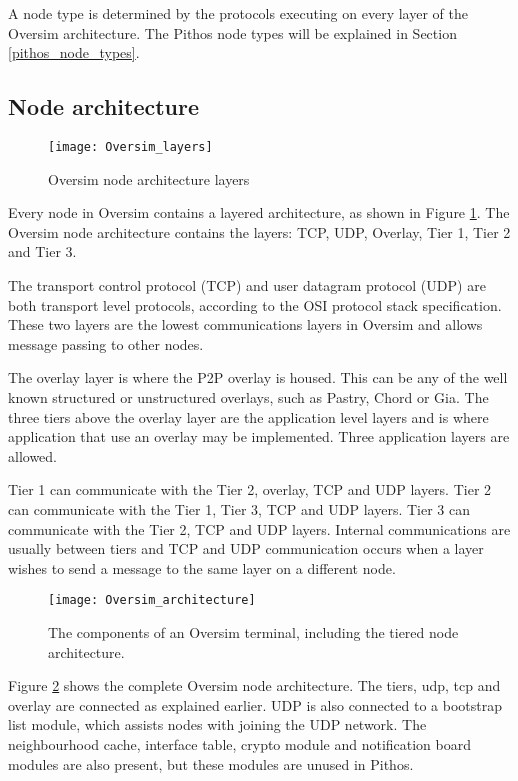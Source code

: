 A node type is determined by the protocols executing on every layer of the Oversim architecture. The Pithos node types will be explained in Section \ref{pithos_node_types}.

    \subsection{Node architecture}

\begin{figure}[htbp]
 \centering
 \texttt{[image: Oversim\_layers]}
 \caption{Oversim node architecture layers}
 \label{fig_oversim_layers}
\end{figure}


Every node in Oversim contains a layered architecture, as shown in Figure \ref{fig_oversim_layers}. The Oversim node architecture contains the layers: TCP, UDP, Overlay, Tier 1, Tier 2 and Tier 3.

The transport control protocol (TCP) and user datagram protocol (UDP) are both transport level protocols, according to the OSI protocol stack specification. These two layers are the lowest communications layers in Oversim and allows message passing to other nodes.

The overlay layer is where the P2P overlay is housed. This can be any of the well known structured or unstructured overlays, such as Pastry, Chord or Gia. The three tiers above the overlay layer are the application level layers and is where application that use an overlay may be implemented. Three application layers are allowed.

Tier 1 can communicate with the Tier 2, overlay, TCP and UDP layers. Tier 2 can communicate with the Tier 1, Tier 3, TCP and UDP layers. Tier 3 can communicate with the Tier 2, TCP and UDP layers. Internal communications are usually between tiers and TCP and UDP communication occurs when a layer wishes to send a message to the same layer on a different node.

\begin{figure}[htbp]
 \centering
 \texttt{[image: Oversim\_architecture]}
 \caption{The components of an Oversim terminal, including the tiered node architecture.}
 \label{fig_oversim_architecture}
\end{figure}

Figure \ref{fig_oversim_architecture} shows the complete Oversim node architecture. The tiers, udp, tcp and overlay are connected as explained earlier. UDP is also connected to a bootstrap list module, which assists nodes with joining the UDP network. The neighbourhood cache, interface table, crypto module and notification board modules are also present, but these modules are unused in Pithos.

